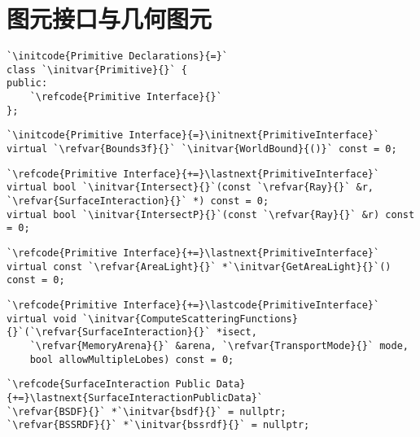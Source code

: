 \section{图元接口与几何图元}\label{sec:图元接口与几何图元}

\begin{lstlisting}
`\initcode{Primitive Declarations}{=}`
class `\initvar{Primitive}{}` {
public:
    `\refcode{Primitive Interface}{}`
};
\end{lstlisting}

\begin{lstlisting}
`\initcode{Primitive Interface}{=}\initnext{PrimitiveInterface}`
virtual `\refvar{Bounds3f}{}` `\initvar{WorldBound}{()}` const = 0;
\end{lstlisting}

\begin{lstlisting}
`\refcode{Primitive Interface}{+=}\lastnext{PrimitiveInterface}`
virtual bool `\initvar{Intersect}{}`(const `\refvar{Ray}{}` &r, `\refvar{SurfaceInteraction}{}` *) const = 0;
virtual bool `\initvar{IntersectP}{}`(const `\refvar{Ray}{}` &r) const = 0;
\end{lstlisting}

\begin{lstlisting}
`\refcode{Primitive Interface}{+=}\lastnext{PrimitiveInterface}`
virtual const `\refvar{AreaLight}{}` *`\initvar{GetAreaLight}{}`() const = 0;
\end{lstlisting}

\begin{lstlisting}
`\refcode{Primitive Interface}{+=}\lastcode{PrimitiveInterface}`
virtual void `\initvar{ComputeScatteringFunctions}{}`(`\refvar{SurfaceInteraction}{}` *isect,
    `\refvar{MemoryArena}{}` &arena, `\refvar{TransportMode}{}` mode,
    bool allowMultipleLobes) const = 0;
\end{lstlisting}

\begin{lstlisting}
`\refcode{SurfaceInteraction Public Data}{+=}\lastnext{SurfaceInteractionPublicData}`
`\refvar{BSDF}{}` *`\initvar{bsdf}{}` = nullptr;
`\refvar{BSSRDF}{}` *`\initvar{bssrdf}{}` = nullptr;
\end{lstlisting}